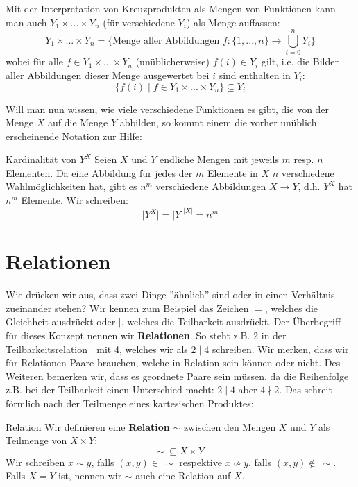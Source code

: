 \begin{example} Mit der Interpretation von Kreuzprodukten als Mengen von Funktionen kann man auch $Y_1 \times ... \times Y_n$ (für verschiedene $Y_i$) als Menge auffassen:
$$Y_1 \times ... \times Y_n = \{\text{Menge aller Abbildungen } f: \{1,...,n\} \to \bigcup_{i=0}^nY_i\}$$
wobei für alle $f \in Y_1 \times ... \times Y_n$ (unüblicherweise) $f(i) \in Y_i$ gilt, i.e. die Bilder aller Abbildungen dieser Menge ausgewertet bei $i$ sind enthalten in $Y_i$: $$\{f(i) \mid f \in Y_1 \times ... \times Y_n\} \subseteq Y_i$$
\end{example}

Will man nun wissen, wie viele verschiedene Funktionen es gibt, die von der Menge $X$ auf die Menge $Y$ abbilden, so kommt einem die vorher unüblich erscheinende Notation zur Hilfe:

\begin{definition}{Kardinalität von $Y^X$}{}
Seien $X$ und $Y$ endliche Mengen mit jeweils $m$ resp. $n$ Elementen. Da eine Abbildung für jedes der $m$ Elemente in $X$ $n$ verschiedene Wahlmöglichkeiten hat, gibt es $n^m$ verschiedene Abbildungen $X \to Y$, d.h. $Y^X$ hat $n^m$ Elemente. Wir schreiben:
$$\vert Y^X \vert = \vert Y \vert ^{\vert X \vert} = n^m$$
\end{definition}

\section{Relationen}
Wie drücken wir aus, dass zwei Dinge ''ähnlich'' sind oder in einen Verhältnis zueinander stehen? Wir kennen zum Beispiel das Zeichen $=$, welches die Gleichheit ausdrückt oder $\mid$, welches die Teilbarkeit ausdrückt. Der Überbegriff für dieses Konzept nennen wir \textbf{Relationen}. So steht z.B. $2$ in der Teilbarkeitsrelation $|$ mit 4, welches wir als $2\mid4$ schreiben. Wir merken, dass wir für Relationen Paare brauchen, welche in Relation sein können oder nicht. Des Weiteren bemerken wir, dass es geordnete Paare sein müssen, da die Reihenfolge z.B. bei der Teilbarkeit einen Unterschied macht: $2\mid4$ aber $4\nmid 2$. Das schreit förmlich nach der Teilmenge eines kartesischen Produktes:

\begin{definition}{Relation}{}
Wir definieren eine \textbf{Relation} $\sim$ zwischen den Mengen $X$ und $Y$ als Teilmenge von $X \times Y$:
$$\sim \ \subseteq X \times Y $$
Wir schreiben $x\sim y$, falls $(x,y) \in \ \sim$ respektive $x \nsim y$, falls $(x,y) \notin \ \sim$.
Falls $X = Y$ ist, nennen wir $\sim$ auch eine Relation auf $X$.
\end{definition}

